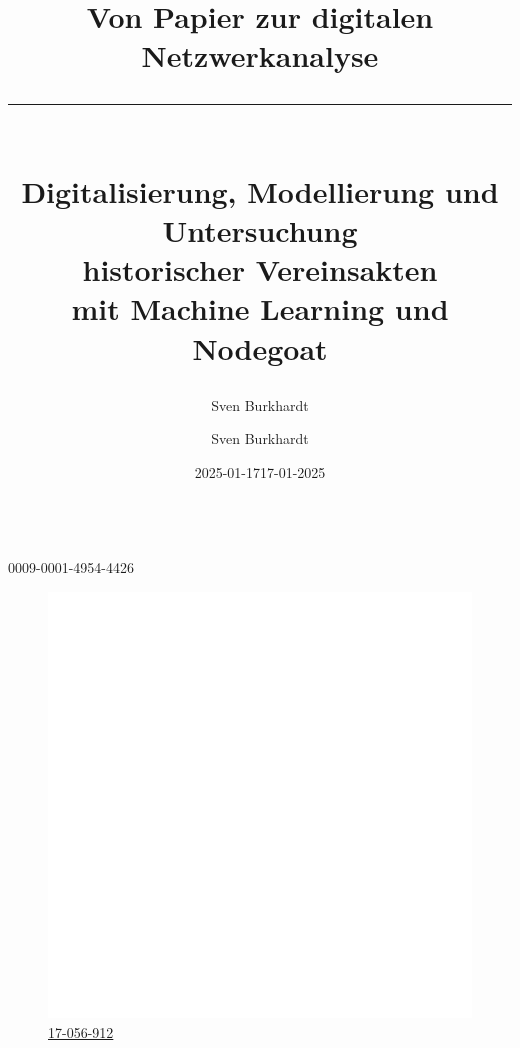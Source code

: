 \documentclass[12pt, a4paper, ngerman, bidi=default]{article}
\title{\vspace*{4cm} \LARGE Von Papier zur digitalen Netzwerkanalyse 
\color{UniMint} \rule{8cm}{0.4pt} \\  
\vspace{0.2cm}  
\color{white}\large Digitalisierung, Modellierung und Untersuchung\\historischer Vereinsakten\\mit Machine Learning und Nodegoat}
\subtitle{}
\author{Sven Burkhardt}
\date{2025-01-17} %
\begin{document}
\begin{titlepage}
    
\color{white}
\pagecolor[HTML]{46505A} %
\date{}
\author{}
\maketitle
\begin{center}
  \author{\LARGE{\author{\vspace{-0.5cm}Sven Burkhardt}}}\\
  \vspace{4mm}
  \large{ {0009-0001-4954-4426}}\\ %
  \begin{figure}[h]
    \centering
    \color{white}
    \large{\href{https://dhlab.philhist.unibas.ch/en/persons/sven-burkhardt/}{{\hspace*{0.5mm}\includegraphics[height=4.5
  mm]{./assets/Logos/Uni_basel_logo_white.png}}\hspace{3.4mm}\color{white} 17-056-912}}\\ %
    
    \date{\hspace*{2mm}17-01-2025}%
  \end{figure}
  \setcounter{figure}{0}
\end{center}



\end{titlepage}
\end{document}
